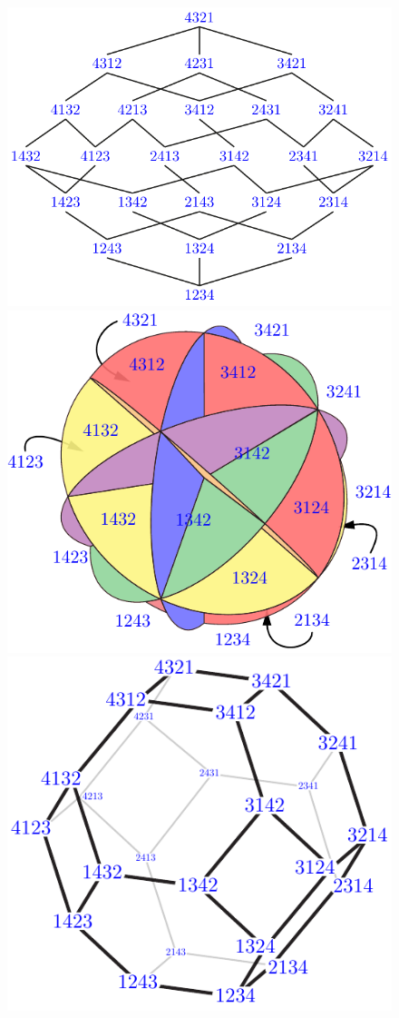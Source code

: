\documentclass{amsart}
\theoremstyle{definition}
\begin{document}
\begin{figure}
	\capstart
	\centerline{\includegraphics[scale=.6]{weakOrderLeft4} \; \includegraphics[scale=.6]{braidFanLeft4} \; \includegraphics[scale=.6]{permutahedronLeft4}}

\end{figure}
\end{document}
